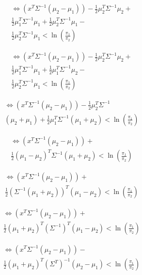 \documentclass{article}
\begin{document}
\begin{multicols}{2}
\[
\begin{split}
\iff \left(x^T \Sigma^{-1} ( \mu_2 - \mu_1 ) \right) - \frac{1}{2}\mu_2^T \Sigma^{-1} \mu_2 + \\ 
\frac{1}{2}\mu_1^T \Sigma^{-1} \mu_1 + \frac{1}{2}\mu_2^T \Sigma^{-1} \mu_1 - \\
\frac{1}{2}\mu_2^T \Sigma^{-1} \mu_1 < \ln \left(\frac{\pi_1}{\pi_2} \right)
\end{split}
\]

\[
\begin{split}
\iff \left(x^T \Sigma^{-1} ( \mu_2 - \mu_1 ) \right) - \frac{1}{2}\mu_2^T \Sigma^{-1} \mu_2 + \\ 
\frac{1}{2}\mu_1^T \Sigma^{-1} \mu_1 + \frac{1}{2}\mu_1^T \Sigma^{-1} \mu_2 - \\
\frac{1}{2}\mu_2^T \Sigma^{-1} \mu_1 < \ln \left(\frac{\pi_1}{\pi_2} \right)
\end{split}
\]

\[
\begin{split}
\iff \left(x^T \Sigma^{-1} ( \mu_2 - \mu_1 ) \right) - \frac{1}{2}\mu_2^T \Sigma^{-1} \\ 
(\mu_2 + \mu_1 ) + \frac{1}{2}\mu_1^T \Sigma^{-1} (\mu_1 + \mu_2) < \ln \left(\frac{\pi_1}{\pi_2} \right)
\end{split}
\]

\[
\begin{split}
\iff \left(x^T \Sigma^{-1} ( \mu_2 - \mu_1 ) \right) + \\
\frac{1}{2} (\mu_1 - \mu_2)^T \Sigma^{-1} (\mu_1 + \mu_2) < \ln \left(\frac{\pi_1}{\pi_2} \right)
\end{split}
\]

\[
\begin{split}
\iff \left(x^T \Sigma^{-1} ( \mu_2 - \mu_1 ) \right) + \\
\frac{1}{2} \left( \Sigma^{-1} (\mu_1 + \mu_2) \right)^T  (\mu_1 - \mu_2)< \ln \left(\frac{\pi_1}{\pi_2} \right)
\end{split}
\]

\[
\begin{split}
\iff \left( x^T \Sigma^{-1} ( \mu_2 - \mu_1 ) \right) + \\
\frac{1}{2} (\mu_1 + \mu_2)^{T} (\Sigma^{-1})^T  (\mu_1 - \mu_2) < \ln \left( \frac{\pi_1}{\pi_2} \right)
\end{split}
\]

\[
\begin{split}
\iff \left(x^T \Sigma^{-1} ( \mu_2 - \mu_1 ) \right) - \\
\frac{1}{2} (\mu_1 + \mu_2)^T (\Sigma^T)^{-1}  (\mu_2 - \mu_1) < \ln \left( \frac{\pi_1}{\pi_2} \right)
\end{split}
\]


\end{multicols}
\end{document}
